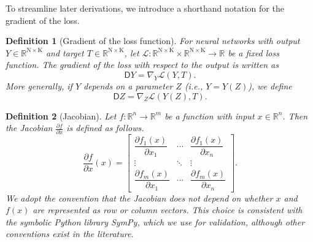 \documentclass[twoside,11pt]{article}
\newtheorem{definition}{Definition}
\newcommand{\const}[1]{\ensuremath{\mathrm{#1}}} %
\newcommand{\Gradient}{\textsf{D}}
\newcommand{\Reals}{\mathbb{R}}
\begin{document}
To streamline later derivations, we introduce a shorthand notation for the gradient of the loss. 
\begin{definition}[Gradient of the loss function] \label{def:gradient}
For neural networks with output $Y \in \Reals^{\const{N} \times \const{K}}$ and target $T \in \Reals^{\const{N} \times \const{K}}$, let $\mathcal{L}: \Reals^{\const{N} \times \const{K}} \times \Reals^{\const{N} \times \const{K}} \rightarrow \Reals$ be a fixed loss function. The gradient of the loss with respect to the output is written as
\begin{equation}
\Gradient Y = \nabla_Y \mathcal{L}(Y, T).
\end{equation}
More generally, if $Y$ depends on a parameter $Z$ (i.e., $Y = Y(Z)$), we define
\begin{equation}
\Gradient Z = \nabla_Z \mathcal{L}(Y(Z), T).  
\end{equation}
\end{definition}

\begin{definition}[Jacobian]
Let $f: \Reals^n \rightarrow \Reals^m$ be a function with input $x \in \Reals^n$. Then the Jacobian $\frac{\partial f}{\partial x}$ is defined as follows.
\begin{equation}
\frac{\partial f}{\partial x}(x) =
\begin{bmatrix}
 \dfrac{\partial f_{1}(x)}{\partial x_{1}} & \cdots & \dfrac {\partial f_{1}(x)}{\partial x_{n}}
   \\
   \vdots & \ddots & \vdots \\
   \dfrac {\partial f_{m}(x)}{\partial x_{1}} & \cdots & \dfrac {\partial f_{m}(x)}{\partial x_{n}}
\end{bmatrix}.
\end{equation}
We adopt the convention that the Jacobian does not depend on whether $x$ and $f(x)$ are represented as row or column vectors. This choice is consistent with the symbolic Python library SymPy, which we use for validation, although other conventions exist in the literature.
\end{definition}
\end{document}
